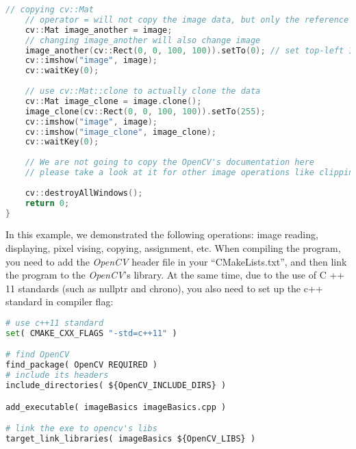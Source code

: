 \begin{lstlisting}[language=C++,caption=slambook/ch5/imageBasics/imageBasics.cpp]
    // copying cv::Mat
    // operator = will not copy the image data, but only the reference
    cv::Mat image_another = image;
    // changing image_another will also change image 
    image_another(cv::Rect(0, 0, 100, 100)).setTo(0); // set top-left 100*100 block to zero
    cv::imshow("image", image);
    cv::waitKey(0);
    
    // use cv::Mat::clone to actually clone the data
    cv::Mat image_clone = image.clone();
    image_clone(cv::Rect(0, 0, 100, 100)).setTo(255);
    cv::imshow("image", image);
    cv::imshow("image_clone", image_clone);
    cv::waitKey(0);
    
    // We are not going to copy the OpenCV's documentation here
    // please take a look at it for other image operations like clipping, rotating and scaling.
    
    cv::destroyAllWindows();
    return 0;
}
\end{lstlisting}

In this example, we demonstrated the following operations: image reading, displaying, pixel vising, copying, assignment, etc. When compiling the program, you need to add the \textit{OpenCV} header file in your ``CMakeLists.txt'', and then link the program to the \textit{OpenCV}'s library. At the same time, due to the use of C ++ 11 standards (such as nullptr and chrono), you also need to set up the c++ standard in compiler flag:

\begin{lstlisting}[language=Python,caption=slambook/ch5/imageBasics/CMakeLists.txt]
# use c++11 standard
set( CMAKE_CXX_FLAGS "-std=c++11" )

# find OpenCV
find_package( OpenCV REQUIRED )
# include its headers
include_directories( ${OpenCV_INCLUDE_DIRS} )

add_executable( imageBasics imageBasics.cpp )

# link the exe to opencv's libs
target_link_libraries( imageBasics ${OpenCV_LIBS} )
\end{lstlisting}

